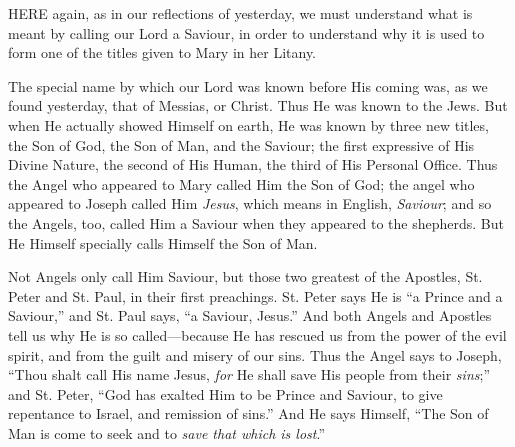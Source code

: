 

HERE
again, as in our reflections of yesterday, we must understand what is
meant by calling our Lord a Saviour, in order to understand why it is
used to form one of the titles given to Mary in her Litany.

The special name by which our
Lord was known before His coming was, as we found yesterday, that of
Messias, or Christ. Thus He was known to the Jews. But when He actually
showed Himself on earth, He was known by three new titles, the Son of
God, the Son of Man, and the Saviour; the first expressive of His Divine
Nature, the second of His Human, the third of His Personal Office. Thus
the Angel who appeared to Mary called Him the Son of God; the angel who
appeared to Joseph called Him \emph{Jesus}, which means in English, \emph{Saviour};
and so the Angels, too, called Him a Saviour when they appeared to the
shepherds. But He Himself specially calls Himself the Son of Man.

Not Angels only call Him Saviour,
but those two greatest of the Apostles, St. Peter and St. Paul, in their
first preachings. St. Peter says He is ``a Prince and a Saviour,'' and St.
Paul says, ``a Saviour, Jesus.'' And both Angels and Apostles tell us why
He is so called—because He has rescued us from the power of the evil
spirit, and from the guilt and misery of our sins. Thus the Angel says
to Joseph, ``Thou shalt call His name Jesus, \emph{for} He shall save His
people from their \emph{sins};'' and St. Peter, ``God has exalted Him to
be Prince and Saviour, to give repentance to Israel, and remission of
sins.'' And He says Himself, ``The Son of Man is come to seek and to \emph{save
that which is lost}.''

